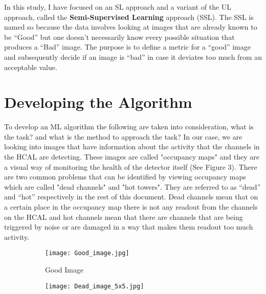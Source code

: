 In this study, I have focused on an SL approach and a variant of the UL approach, called the \textbf{Semi-Supervised Learning} approach (SSL). The SSL is named so because the data involves looking at images that are already known to be “Good” but one doesn’t necessarily know every possible situation that produces a “Bad” image. The purpose is to define a metric for a “good” image and subsequently decide if an image is “bad” in case it deviates too much from an acceptable value.



\section{Developing the Algorithm}

To develop an ML algorithm the following are taken into consideration, what is the task? and what is the method to approach the task? In our case, we are looking into images that have information about the activity that the channels in the HCAL are detecting. These images are called "occupancy maps" and they are a visual way of monitoring the health of the detector itself (See Figure 3). There are two common problems that can be identified by viewing occupancy maps which are called "dead channels" and "hot towers". They are referred to as “dead” and “hot” respectively in the rest of this document. Dead channels mean that on a certain place in the occupancy map there is not any readout from the channels on the HCAL and hot channels mean that there are channels that are being triggered by noise or are damaged in a way that makes them readout too much activity.

\begin{center}
\begin{figure}
\begin{subfigure}[h]{0.20\linewidth}
\texttt{[image: Good\_image.jpg]}
\caption{Good Image\label{Goodimage}}
\end{subfigure}
\begin{subfigure}[h]{0.30\linewidth}
\texttt{[image: Dead\_image\_5x5.jpg]}
\end{subfigure}
\end{figure}
\end{center}